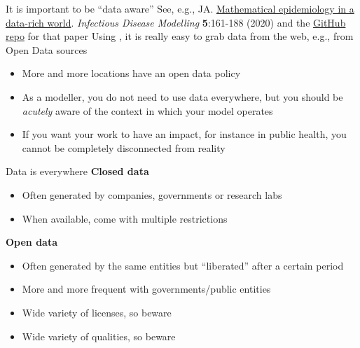 \documentclass[aspectratio=169]{beamer}\usepackage[]{graphicx}\usepackage[]{xcolor}
\begin{document}


\begin{frame}{It is important to be ``data aware''}
See, e.g., JA. \href{http://dx.doi.org/10.1016/j.idm.2019.12.008}{Mathematical epidemiology in a data-rich world}. \emph{Infectious Disease Modelling} \textbf{5}:161-188 (2020) and the \href{https://github.com/julien-arino/modelling-with-data}{GitHub repo} for that paper
\vfill
Using , it is really easy to grab data from the web, e.g., from Open Data sources
\vfill
\begin{itemize}
\item More and more locations have an open data policy
\vfill
\item As a modeller, you do not need to use data everywhere, but you should be \emph{acutely} aware of the context in which your model operates
\vfill
\item If you want your work to have an impact, for instance in public health, you cannot be completely disconnected from reality
\end{itemize}
\end{frame}

\begin{frame}{Data is everywhere}
\textbf{Closed data}
\begin{itemize}
    \item Often generated by companies, governments or research labs
    \item When available, come with multiple restrictions
\end{itemize}
\vfill
\textbf{Open data}
\begin{itemize}
    \item Often generated by the same entities but ``liberated'' after a certain period
    \item More and more frequent with governments/public entities 
    \item Wide variety of licenses, so beware 
    \item Wide variety of qualities, so beware
\end{itemize}
\end{frame}
\end{document}
